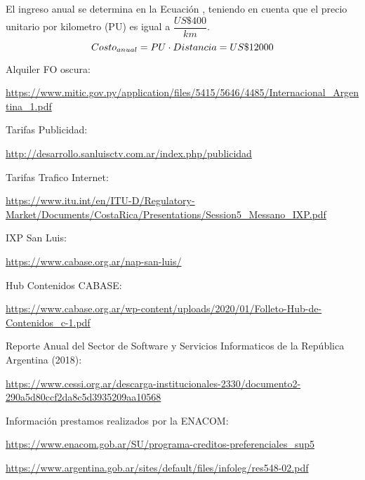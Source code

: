 El ingreso anual se determina en la Ecuación , teniendo en cuenta que el precio unitario por kilometro (PU) es igual a $\dfrac{US\$ 400}{km}$.
\begin{equation}
 Costo_{anual} = PU \cdot Distancia \\ 
 = US\$ 12000
\end{equation}









\begin{thebibliography}{99}
 Alquiler FO oscura: \begin{tiny}
\url{https://www.mitic.gov.py/application/files/5415/5646/4485/Internacional_Argentina_1.pdf}
\end{tiny}

 Tarifas Publicidad: \begin{tiny}
\url{http://desarrollo.sanluisctv.com.ar/index.php/publicidad}
\end{tiny}

 Tarifas Trafico Internet: \begin{tiny}
\url{https://www.itu.int/en/ITU-D/Regulatory-Market/Documents/CostaRica/Presentations/Session5_Messano_IXP.pdf}
\end{tiny}

 IXP San Luis:
\begin{tiny}
\url{https://www.cabase.org.ar/nap-san-luis/}
\end{tiny}

 Hub Contenidos CABASE:
\begin{tiny}
\url{https://www.cabase.org.ar/wp-content/uploads/2020/01/Folleto-Hub-de-Contenidos_c-1.pdf}
\end{tiny}

 Reporte Anual del Sector de Software y Servicios Informaticos de la República Argentina (2018):


\begin{tiny}
\url{https://www.cessi.org.ar/descarga-institucionales-2330/documento2-290a5d80ccf2da8c5d3935209aa10568}
\end{tiny}

 Información prestamos realizados por la ENACOM:

\begin{tiny}
\url{https://www.enacom.gob.ar/SU/programa-creditos-preferenciales_sup5}
\end{tiny}

\begin{tiny}
\url{https://www.argentina.gob.ar/sites/default/files/infoleg/res548-02.pdf}
\end{tiny}


\end{thebibliography}


